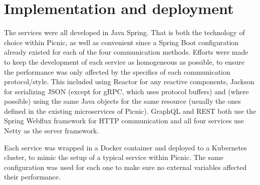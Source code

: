 \section{Implementation and deployment}
The services were all developed in Java Spring. That is both the technology of choice within Picnic, as well as convenient since a Spring Boot configuration already existed for each of the four communication methods. Efforts were made to keep the development of each service as homogeneous as possible, to ensure the performance was only affected by the specifics of each communication protocol/style. This included using Reactor for any reactive components, Jackson for serializing JSON (except for gRPC, which uses protocol buffers) and (where possible) using the same Java objects for the same resource (usually the ones defined in the existing microservices of Picnic). GraphQL and REST both use the Spring Webflux framework for HTTP communication and all four services use Netty as the server framework. 

Each service was wrapped in a Docker container and deployed to a Kubernetes cluster, to mimic the setup of a typical service within Picnic. The same configuration was used for each one to make sure no external variables affected their performance. 